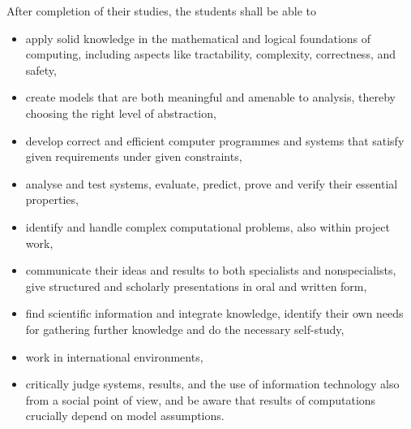 

After completion of their studies, the students shall be able to
\begin{itemize}
\item apply solid knowledge in the mathematical and logical
  foundations of computing, including aspects like tractability,
  complexity, correctness, and safety,
\item create models that are both meaningful and amenable to analysis,
  thereby choosing the right level of abstraction,
\item develop correct and efficient computer programmes and systems
  that satisfy given requirements under given constraints,
\item analyse and test systems, evaluate, predict, prove and verify
  their essential properties,
\item identify and handle complex computational problems, also within
  project work, 
\item communicate their ideas and results to both specialists and
  nonspecialists, give structured and scholarly presentations in oral
  and written form,
\item find scientific information and integrate knowledge, identify
  their own needs for gathering further knowledge and do the necessary
  self-study,
\item work in international environments,
\item critically judge systems, results, and the use of information
  technology also from a social point of view, and be aware that
  results of computations crucially depend on model assumptions.
\end{itemize}

